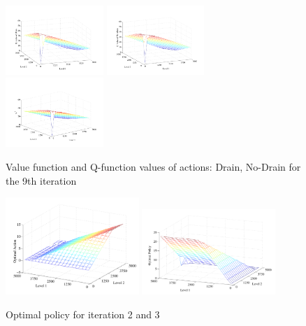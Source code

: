 \begin{figure}[t]
\centering
\includegraphics[width=0.33\textwidth]{Figures1/reservoir/Q9-Drain.pdf}
\includegraphics[width=0.33\textwidth]{Figures1/reservoir/Q9-noDrain.pdf}
\includegraphics[width=0.33\textwidth]{Figures1/reservoir/v9plot.pdf}
\caption{%
Value function and Q-function values of actions: Drain, No-Drain for the 9th iteration
}
\label{fig:v9plots}
\end{figure}

\begin{figure}[t]
\centering
\includegraphics[width=0.45\textwidth]{Figures1/reservoir/policy-iteration2.pdf}
\includegraphics[width=0.45\textwidth]{Figures1/reservoir/policy-iteration3.pdf}
\caption{%
Optimal policy for iteration 2 and 3
}
\label{fig:policyplots}
\end{figure}
